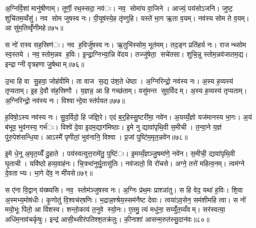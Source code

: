 अ॒ग्निर्वि॒शां मानु॑षीणाम्। तूर्णी॒ रथ॒स्सदा॒ नव॑ः। नव॒ सोमा॑य वा॒जिने। आज्यं॒ पय॑सोऽजनि। जुष्ट॒ शुचि॑तम॒व्वँसु॑। नव सोम जुषस्व नः। पी॒यूष॑स्ये॒ह तृ॑प्णुहि। यस्ते॑ भा॒ग ऋ॒ता व॒यम्। नव॑स्य सोम ते व॒यम्। आ सु॑म॒तिव्वृँ॑णीमहे॥७५॥

स नो॑ रास्व सह॒स्रिण॑ः। नव ह॒विर्जु॑षस्व नः। ऋ॒तुभि॑स्सोम॒ भूत॑मम्। तद॒ङ्ग प्रति॑हर्य नः। राजन्थ्सोम स्व॒स्तये। नव॒स्तोम॒न्नव ह॒विः। इ॒न्द्रा॒ग्निभ्या॒न्नि वे॑दय। तज्जु॑षेता॒ सचे॑तसा। शुचि॒न्नु स्तोम॒न्नव॑जातम॒द्य। इन्द्राग्नी वृत्रहणा जु॒षेथाम्॥७६॥

उ॒भा हि वा सु॒हवा॒ जोह॑वीमि। ता वाज स॒द्य उ॑श॒ते धेष्ठा। अ॒ग्निरिन्द्रो॒ नव॑स्य नः। अ॒स्य ह॒व्यस्य॑ तृप्यताम्। इ॒ह दे॒वौ स॑ह॒स्रिणौ। य॒ज्ञन्न॒ आ हि गच्छ॑ताम्। वसु॑मन्त सुव॒र्विदम्। अ॒स्य ह॒व्यस्य॑ तृप्यताम्। अ॒ग्निरिन्द्रो॒ नव॑स्य नः। विश्वान्दे॒वास्त॑र्पयत॥७७॥

ह॒विषो॒ऽस्य नव॑स्य नः। सु॒व॒र्विदो॒ हि ज॑ज्ञि॒रे। एदं ब॒र्॒हिस्सु॒ष्टरी॑मा॒ नवे॑न। अ॒यय्यँ॒ज्ञो यज॑मानस्य भा॒गः। अ॒यं ब॑भूव॒ भुव॑नस्य॒ गर्भ॑ः। विश्वे॑ दे॒वा इ॒दम॒द्याग॑मिष्ठाः। इ॒मे नु द्यावा॑पृथि॒वी स॒मीची। त॒न्वा॒ने य॒ज्ञं पु॑रु॒पेश॑सन्धि॒या। आऽस्मै॑ पृणीतां॒ भुव॑नानि॒ विश्वा। प्र॒जां पुष्टि॑म॒मृत॒न्नवे॑न॥७८॥

इ॒मे धे॒नू अ॒मृत॒य्येँ दु॒हाते। पय॑स्वत्युत्त॒रामे॑तु॒ पुष्टि॑ः। इ॒मय्यँ॒ज्ञञ्जु॒षमा॑णे॒ नवे॑न। स॒मीची॒ द्यावा॑पृथि॒वी घृ॒ताची। यवि॑ष्ठो हव्य॒वाह॑नः। चि॒त्रभा॑नुर्घु॒तासु॑तिः। नव॑जातो॒ वि रो॑चसे। अग्ने॒ तत्ते॑ महित्व॒नम्। त्वम॑ग्ने दे॒वताभ्यः। भा॒गे दे॑व॒ न मी॑यसे॥७९॥

स ए॑ना वि॒द्वान् य॑ख्ष्यसि। नव॒ स्तोम॑ञ्जुषस्व नः। अ॒ग्निः प्र॑थ॒मः प्राश्ञा॑तु। स हि वेद॒ यथा॑ ह॒विः। शि॒वा अ॒स्मभ्य॒मोष॑धीः। कृ॒णोतु॑ वि॒श्वच॑र्‌षणिः। भ॒द्रान्न॒श्श्रेय॒स्सम॑नैष्ट देवाः। त्वया॑ऽव॒सेन॒ सम॑शीमहि त्वा। स नो॑ मयो॒भूः पि॑तो॒ आ वि॑शस्व। शन्तो॒काय॑ त॒नुवे स्यो॒नः। ए॒तमु॒ त्यं मधु॑ना॒ सय्युँ॑त॒य्यँवम्। सर॑स्वत्या॒ अधि॑म॒नाव॑चर्कृषुः। इन्द्र॑ आसी॒थ्सीर॑पतिश्श॒तक्र॑तुः। की॒नाशा॑ आसन्म॒रुत॑स्सु॒दान॑वः॥८०॥




